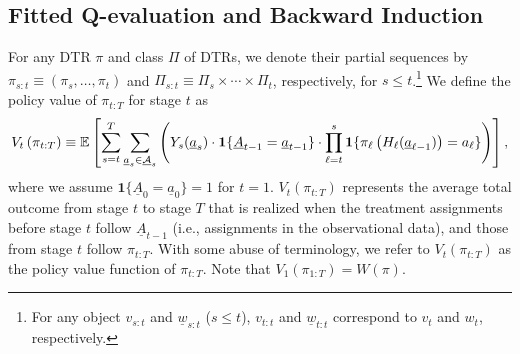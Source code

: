 \subsection{Fitted Q-evaluation and Backward Induction}
\label{sec:fitted_Q}

For any DTR $\pi$ and class $\Pi$ of DTRs, we denote their partial sequences by $\pi_{s:t} \equiv (\pi_s,\ldots,\pi_t)$ and $\Pi_{s:t} \equiv \Pi_s \times \cdots \times \Pi_t$, respectively, for $s\leq t$.\footnote{For any object $v_{s:t}$ and $\underline{w}_{s:t}$ ($s\leq t$), $v_{t:t}$ and $\underline{w}_{t:t}$ correspond to $v_t$ and $w_t$, respectively.}
We define the policy value of $\pi_{t:T}$ for stage $t$ as 
\begin{align*}
    V_{t}\left(\pi_{t:T}\right) \equiv \mathbb{E}\left[\sum_{s=t}^{T}\sum_{\underline{a}_{s} \in \underline{\mathcal{A}}_{s}}\left( Y_{s}(\underline{a}_{s})\cdot \mathbf{1}\{\underline{A}_{t-1} = \underline{a}_{t-1}\} \cdot \prod_{\ell=t}^{s}\mathbf{1}\{\pi_{\ell}\left(H_{\ell}(\underline{a}_{\ell-1})\right)=a_\ell\}\right)\right],
\end{align*}
where we assume $\mathbf{1}\{\underline{A}_{0} = \underline{a}_{0}\}=1$ for $t=1$. $V_{t}\left(\pi_{t:T}\right)$
represents the average total outcome from stage $t$ to stage $T$ that is realized when the treatment assignments before stage $t$ follow $\underline{A}_{t-1}$ (i.e., assignments in the observational data), and those from stage $t$ follow $\pi_{t:T}$.
With some abuse of terminology, we refer to $V_{t}\left(\pi_{t:T}\right)$ as the policy value function of $\pi_{t:T}$.
Note that $V_{1}(\pi_{1:T}) = W(\pi)$.

